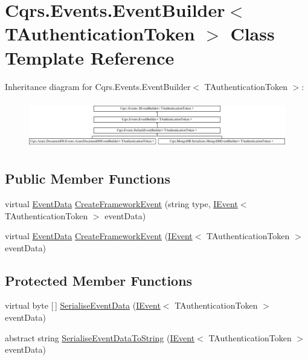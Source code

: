 \hypertarget{classCqrs_1_1Events_1_1EventBuilder}{}\section{Cqrs.\+Events.\+Event\+Builder$<$ T\+Authentication\+Token $>$ Class Template Reference}
\label{classCqrs_1_1Events_1_1EventBuilder}
Inheritance diagram for Cqrs.\+Events.\+Event\+Builder$<$ T\+Authentication\+Token $>$\+:\begin{figure}[H]
\begin{center}
\leavevmode
\includegraphics[height=2.117202cm]{classCqrs_1_1Events_1_1EventBuilder}
\end{center}
\end{figure}
\subsection*{Public Member Functions}
\begin{DoxyCompactItemize}
\item 
virtual \hyperlink{classCqrs_1_1Events_1_1EventData}{Event\+Data} \hyperlink{classCqrs_1_1Events_1_1EventBuilder_aa6a794ef27f2795802a4390fd16535f6_aa6a794ef27f2795802a4390fd16535f6}{Create\+Framework\+Event} (string type, \hyperlink{interfaceCqrs_1_1Events_1_1IEvent}{I\+Event}$<$ T\+Authentication\+Token $>$ event\+Data)
\item 
virtual \hyperlink{classCqrs_1_1Events_1_1EventData}{Event\+Data} \hyperlink{classCqrs_1_1Events_1_1EventBuilder_abcc2515f98e4852ab656f1868e7a344c_abcc2515f98e4852ab656f1868e7a344c}{Create\+Framework\+Event} (\hyperlink{interfaceCqrs_1_1Events_1_1IEvent}{I\+Event}$<$ T\+Authentication\+Token $>$ event\+Data)
\end{DoxyCompactItemize}
\subsection*{Protected Member Functions}
\begin{DoxyCompactItemize}
\item 
virtual byte \mbox{[}$\,$\mbox{]} \hyperlink{classCqrs_1_1Events_1_1EventBuilder_a5392c1e86ea54fb96ee7af3a57f9af5a_a5392c1e86ea54fb96ee7af3a57f9af5a}{Serialise\+Event\+Data} (\hyperlink{interfaceCqrs_1_1Events_1_1IEvent}{I\+Event}$<$ T\+Authentication\+Token $>$ event\+Data)
\item 
abstract string \hyperlink{classCqrs_1_1Events_1_1EventBuilder_aefa7bfaea90123e143e108d46efc6603_aefa7bfaea90123e143e108d46efc6603}{Serialise\+Event\+Data\+To\+String} (\hyperlink{interfaceCqrs_1_1Events_1_1IEvent}{I\+Event}$<$ T\+Authentication\+Token $>$ event\+Data)
\end{DoxyCompactItemize}


